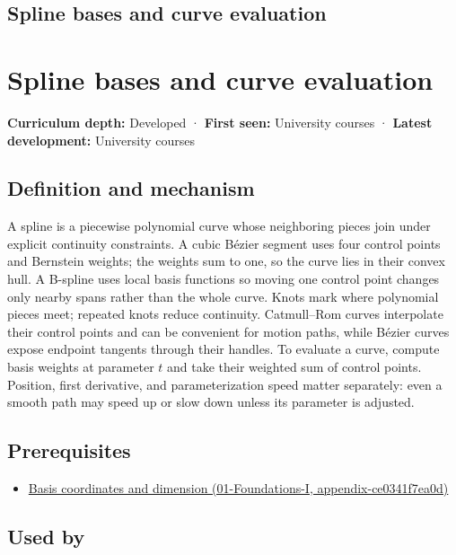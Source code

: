 \hypertarget{appendix-f28eeec97a3d}{}
\section*{Spline bases and curve evaluation}
\chapter{Spline bases and curve evaluation}\label{appendix-f28eeec97a3d-spline-bases-and-curve-evaluation}

\textbf{Curriculum depth:} Developed · \textbf{First seen:} University courses · \textbf{Latest development:} University courses

\section{Definition and mechanism}\label{appendix-f28eeec97a3d-definition-and-mechanism}

A spline is a piecewise polynomial curve whose neighboring pieces join under explicit continuity constraints. A cubic Bézier segment uses four control points and Bernstein weights; the weights sum to one, so the curve lies in their convex hull. A B-spline uses local basis functions so moving one control point changes only nearby spans rather than the whole curve. Knots mark where polynomial pieces meet; repeated knots reduce continuity. Catmull--Rom curves interpolate their control points and can be convenient for motion paths, while Bézier curves expose endpoint tangents through their handles. To evaluate a curve, compute basis weights at parameter \(t\) and take their weighted sum of control points. Position, first derivative, and parameterization speed matter separately: even a smooth path may speed up or slow down unless its parameter is adjusted.

\section{Prerequisites}\label{appendix-f28eeec97a3d-prerequisites}

\begin{itemize}
\tightlist
\item
  \href{../01-Foundations-I/main.pdf\#nameddest=appendix-ce0341f7ea0d}{Basis coordinates and dimension (01-Foundations-I, appendix-ce0341f7ea0d)}
\end{itemize}

\section{Used by}\label{appendix-f28eeec97a3d-used-by}

